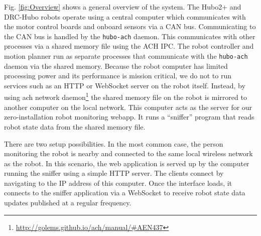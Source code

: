 \documentclass[letterpaper, 10 pt, conference]{ieee/ieeeconf}  %
\begin{document}
Fig. \ref{fig:Overview} shows a general overview of the system.
The Hubo2+ and DRC-Hubo robots operate using a central computer which communicates with the motor control boards and onboard sensors via a CAN bus.
Communicating to the CAN bus is handled by the \texttt{hubo-ach} daemon. \cite{lofaro2013unified}
This communicates with other processes via a shared memory file using the ACH IPC.  \cite{dantam2012robust}
The robot controller and motion planner run as separate processes that communicate with the \texttt{hubo-ach} daemon via the shared memory.
Because the robot computer has limited processing power and its performance is mission critical, we do not to run services such as an HTTP or WebSocket server on the robot itself.
Instead, by using ach network daemon\footnote{\url{http://golems.github.io/ach/manual/\#AEN437}} the shared memory file on the robot is mirrored to another computer on the local network.
This computer acts as the server for our zero-installation robot monitoring webapp.
It runs a ``sniffer'' program that reads robot state data from the shared memory file.

There are two setup possibilities.
In the most common case, the person monitoring the robot is nearby and connected to the same local wireless network as the robot.
In this scenario, the web application is served up by the computer running the sniffer using a simple HTTP server.
The clients connect by navigating to the IP address of this computer.
Once the interface loads, it connects to the sniffer application via a WebSocket to receive robot state data updates published at a regular frequency.
\end{document}
